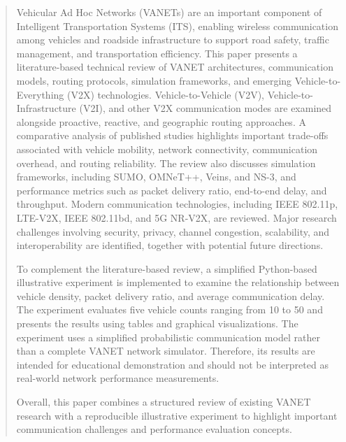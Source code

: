 
\setlength{\parindent}{0em}

\begin{abstract}

Vehicular Ad Hoc Networks (VANETs) are an important
component of Intelligent Transportation Systems (ITS),
enabling wireless communication among vehicles and
roadside infrastructure to support road safety,
traffic management, and transportation efficiency.
This paper presents a literature-based technical
review of VANET architectures, communication models,
routing protocols, simulation frameworks, and
emerging Vehicle-to-Everything (V2X) technologies.
Vehicle-to-Vehicle (V2V), Vehicle-to-Infrastructure
(V2I), and other V2X communication modes are examined
alongside proactive, reactive, and geographic routing
approaches. A comparative analysis of published
studies highlights important trade-offs associated
with vehicle mobility, network connectivity,
communication overhead, and routing reliability.
The review also discusses simulation frameworks,
including SUMO, OMNeT++, Veins, and NS-3, and
performance metrics such as packet delivery ratio,
end-to-end delay, and throughput. Modern communication
technologies, including IEEE 802.11p, LTE-V2X,
IEEE 802.11bd, and 5G NR-V2X, are reviewed.
Major research challenges involving security,
privacy, channel congestion, scalability, and
interoperability are identified, together with
potential future directions.

To complement the literature-based review, a
simplified Python-based illustrative experiment
is implemented to examine the relationship between
vehicle density, packet delivery ratio, and average
communication delay. The experiment evaluates
five vehicle counts ranging from 10 to 50 and
presents the results using tables and graphical
visualizations. The experiment uses a simplified
probabilistic communication model rather than
a complete VANET network simulator. Therefore,
its results are intended for educational
demonstration and should not be interpreted as
real-world network performance measurements.

Overall, this paper combines a structured review
of existing VANET research with a reproducible
illustrative experiment to highlight important
communication challenges and performance
evaluation concepts.

\end{abstract}
